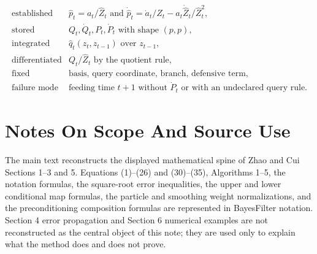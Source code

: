 \documentclass[11pt]{article}
\numberwithin{equation}{section}
\begin{document}
\begin{equation}
\begin{array}{ll}
\text{established} &
    \widehat p_t=a_t/\widehat Z_t
    \text{ and }
    \dot{\widehat p}_t=\dot a_t/\widehat Z_t
    -a_t\dot{\widehat Z}_t/\widehat Z_t^2,\\[1mm]
\text{stored} &
    Q_t,\dot Q_t,P_t,\dot P_t
    \text{ with shape }(p,p),\\[1mm]
\text{integrated} &
    \widehat q_t(z_t,z_{t-1}) \text{ over } z_{t-1},\\[1mm]
\text{differentiated} &
    Q_t/\widehat Z_t \text{ by the quotient rule},\\[1mm]
\text{fixed} &
    \text{basis, query coordinate, branch, defensive term},\\[1mm]
\text{failure mode} &
    \text{feeding time }t+1\text{ without }\dot P_t
    \text{ or with an undeclared query rule.}
\end{array}
\label{eq:p24-p22-r4}
\end{equation}

\appendix
\section{Notes On Scope And Source Use}

The main text reconstructs the displayed mathematical spine of Zhao and Cui \cite{zhao2024ttsequential}
Sections 1--3 and 5.  Equations (1)--(26) and (30)--(35), Algorithms 1--5,
the notation formulas, the square-root error inequalities, the upper and lower
conditional map formulas, the particle and smoothing weight normalizations, and
the preconditioning composition formulas are represented in BayesFilter
notation.  Section 4 error propagation and Section 6 numerical examples are
not reconstructed as the central object of this note; they are used only to
explain what the method does and does not prove.



\end{document}
